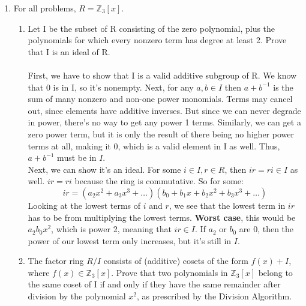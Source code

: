 
\usepackage{amsmath, amssymb, dsfont}

\newenvironment{amatrix}[1]{%
  \left(\begin{array}{@{}*{#1}{c}|c@{}}
}{%
  \end{array}\right)
}

\makeatletter
\renewcommand*\env@matrix[1][*\c@MaxMatrixCols c]{%
  \hskip -\arraycolsep
  \let\@ifnextchar\new@ifnextchar
  \array{#1}}
\makeatother

\newcommand{\?}{\stackrel{?}{=}}



\pagestyle{myheadings}


\begin{enumerate}
  \item For all problems, $R = \mathds{Z}_3[x]$.
    \begin{enumerate}
      \item Let I be the subset of R consisting of the zero polynomial, plus the polynomials for which every nonzero term has degree at least 2. Prove that I is an ideal of R.\\\\

        First, we have to show that I is a valid additive subgroup of R. We know that 0 is in I, so it's nonempty. Next, for any $a,b \in I$ then $a + b^{-1}$ is the sum of many nonzero and non-one power monomials. Terms may cancel out, since elements have additive inverses. But since we can never degrade in power, there's no way to get any power 1 terms. Similarly, we can get a zero power term, but it is only the result of there being no higher power terms at all, making it 0, which is a valid element in I as well. Thus, $a + b^{-1}$ must be in $I$.\\

        Next, we can show it's an ideal. For some $i \in I, r \in R$, then $ir = ri \in I$ as well. $ir = ri$ because the ring is commutative. So for some:
        $$ir = (a_2x^2+a_3x^3+\ldots)(b_0+b_1x+b_2x^2+b_3x^3+\ldots)$$
        Looking at the lowest terms of $i$ and $r$, we see that the lowest term in $ir$ has to be from multiplying the lowest terms. \textbf{Worst case}, this would be $a_2b_0x^2$, which is power 2, meaning that $ir \in I$. If $a_2$ or $b_0$ are 0, then the power of our lowest term only increases, but it's still in $I$.\\


      \item The factor ring $R/I$ consists of (additive) cosets of the form $f(x) + I$, where $f(x) \in \mathds{Z}_3[x]$. Prove that two polynomials in $\mathds{Z}_3[x]$ belong to the same coset of I if and only if they have the same remainder after division by the polynomial $x^2$, as prescribed by the Division Algorithm.\\\\


\end{enumerate}
\end{enumerate}
